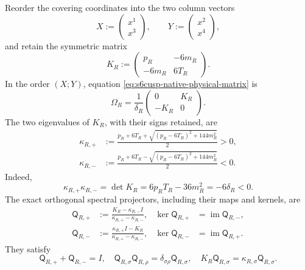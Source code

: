 Reorder the covering coordinates into the two column vectors
\begin{equation}\label{eq:s6cusp-native-XY-blocks}
 X:=\begin{pmatrix}x^1\\x^3\end{pmatrix},
 \qquad
 Y:=\begin{pmatrix}x^2\\x^4\end{pmatrix},
 \end{equation}
and retain the symmetric matrix
\begin{equation}\label{eq:s6cusp-native-K-matrix}
 K_R:=
 \begin{pmatrix}
 p_R&-6m_R\\
 -6m_R&6T_R
 \end{pmatrix}.
\end{equation}
In the order \((X;Y)\), equation
\eqref{eq:s6cusp-native-physical-matrix} is
\begin{equation}\label{eq:s6cusp-native-skew-block}
 \Omega_R=\frac1{\delta_R}
 \begin{pmatrix}0&K_R\\-K_R&0\end{pmatrix}.
\end{equation}
The two eigenvalues of \(K_R\), with their signs retained, are
\begin{align}
 \kappa_{R,+}
 &:=\frac{p_R+6T_R+
 \sqrt{(p_R-6T_R)^2+144m_R^2}}{2}>0,
 \label{eq:s6cusp-kappa-plus}\\
 \kappa_{R,-}
 &:=\frac{p_R+6T_R-
 \sqrt{(p_R-6T_R)^2+144m_R^2}}{2}<0.
 \label{eq:s6cusp-kappa-minus}
\end{align}
Indeed,
\begin{equation}\label{eq:s6cusp-kappa-product}
 \kappa_{R,+}\kappa_{R,-}
 =\det K_R=6p_RT_R-36m_R^2=-6\delta_R<0.
\end{equation}
The exact orthogonal spectral projectors, including their maps and kernels,
are
\begin{align}
 \mathsf Q_{R,+}
 &:=\frac{K_R-\kappa_{R,-}I}
 {\kappa_{R,+}-\kappa_{R,-}},
 &\ker\mathsf Q_{R,+}&=\operatorname{im}\mathsf Q_{R,-},
 \label{eq:s6cusp-native-projector-plus}\\
 \mathsf Q_{R,-}
 &:=\frac{\kappa_{R,+}I-K_R}
 {\kappa_{R,+}-\kappa_{R,-}},
 &\ker\mathsf Q_{R,-}&=\operatorname{im}\mathsf Q_{R,+}.
 \label{eq:s6cusp-native-projector-minus}
\end{align}
They satisfy
\begin{equation}\label{eq:s6cusp-native-projector-identities}
 \mathsf Q_{R,+}+\mathsf Q_{R,-}=I,
 \quad
 \mathsf Q_{R,\sigma}\mathsf Q_{R,\rho}
 =\delta_{\sigma\rho}\mathsf Q_{R,\sigma},
 \quad
 K_R\mathsf Q_{R,\sigma}
 =\kappa_{R,\sigma}\mathsf Q_{R,\sigma}.
\end{equation}
